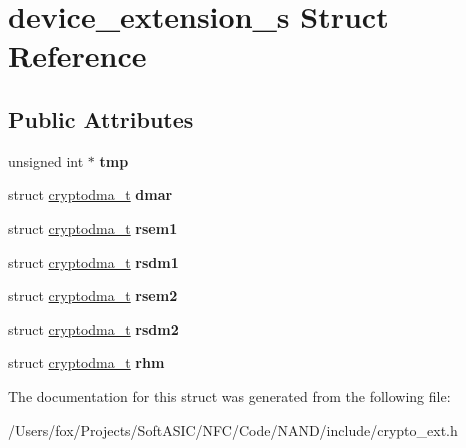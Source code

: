 \hypertarget{structdevice__extension__s}{
\section{device\_\-extension\_\-s Struct Reference}
\label{structdevice__extension__s}
}
\subsection*{Public Attributes}
\begin{DoxyCompactItemize}
\item 
\hypertarget{structdevice__extension__s_ae7003c5565a2cfdca1bfb8ae681fd1a7}{
unsigned int $\ast$ {\bfseries tmp}}
\label{structdevice__extension__s_ae7003c5565a2cfdca1bfb8ae681fd1a7}

\item 
\hypertarget{structdevice__extension__s_a6f82242dbff33fa4246cacd31dee5e48}{
struct \hyperlink{structcryptodma__t}{cryptodma\_\-t} {\bfseries dmar}}
\label{structdevice__extension__s_a6f82242dbff33fa4246cacd31dee5e48}

\item 
\hypertarget{structdevice__extension__s_a68e6b61f42e92e1752221890b324baf9}{
struct \hyperlink{structcryptodma__t}{cryptodma\_\-t} {\bfseries rsem1}}
\label{structdevice__extension__s_a68e6b61f42e92e1752221890b324baf9}

\item 
\hypertarget{structdevice__extension__s_ac4c4c3707383494d547a6755280a3646}{
struct \hyperlink{structcryptodma__t}{cryptodma\_\-t} {\bfseries rsdm1}}
\label{structdevice__extension__s_ac4c4c3707383494d547a6755280a3646}

\item 
\hypertarget{structdevice__extension__s_aa139e1501d0465ffe8bedc4c86d59f7d}{
struct \hyperlink{structcryptodma__t}{cryptodma\_\-t} {\bfseries rsem2}}
\label{structdevice__extension__s_aa139e1501d0465ffe8bedc4c86d59f7d}

\item 
\hypertarget{structdevice__extension__s_ad396ff2ab677fe211c38eea9fb11cd19}{
struct \hyperlink{structcryptodma__t}{cryptodma\_\-t} {\bfseries rsdm2}}
\label{structdevice__extension__s_ad396ff2ab677fe211c38eea9fb11cd19}

\item 
\hypertarget{structdevice__extension__s_ad65eb031c308f3b552c7d931b2839099}{
struct \hyperlink{structcryptodma__t}{cryptodma\_\-t} {\bfseries rhm}}
\label{structdevice__extension__s_ad65eb031c308f3b552c7d931b2839099}

\end{DoxyCompactItemize}


The documentation for this struct was generated from the following file:\begin{DoxyCompactItemize}
\item 
/Users/fox/Projects/SoftASIC/NFC/Code/NAND/include/crypto\_\-ext.h\end{DoxyCompactItemize}
